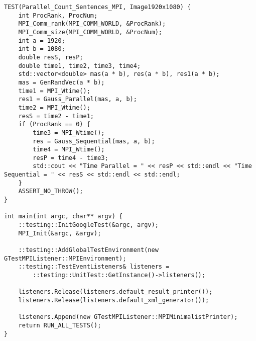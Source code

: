 \documentclass{report}
\begin{document}
\begin{lstlisting}
TEST(Parallel_Count_Sentences_MPI, Image1920x1080) {
    int ProcRank, ProcNum;
    MPI_Comm_rank(MPI_COMM_WORLD, &ProcRank);
    MPI_Comm_size(MPI_COMM_WORLD, &ProcNum);
    int a = 1920;
    int b = 1080;
    double resS, resP;
    double time1, time2, time3, time4;
    std::vector<double> mas(a * b), res(a * b), res1(a * b);
    mas = GenRandVec(a * b);
    time1 = MPI_Wtime();
    res1 = Gauss_Parallel(mas, a, b);
    time2 = MPI_Wtime();
    resS = time2 - time1;
    if (ProcRank == 0) {
        time3 = MPI_Wtime();
        res = Gauss_Sequential(mas, a, b);
        time4 = MPI_Wtime();
        resP = time4 - time3;
        std::cout << "Time Parallel = " << resP << std::endl << "Time Sequential = " << resS << std::endl << std::endl;
    }
    ASSERT_NO_THROW();
}

int main(int argc, char** argv) {
    ::testing::InitGoogleTest(&argc, argv);
    MPI_Init(&argc, &argv);

    ::testing::AddGlobalTestEnvironment(new GTestMPIListener::MPIEnvironment);
    ::testing::TestEventListeners& listeners =
        ::testing::UnitTest::GetInstance()->listeners();

    listeners.Release(listeners.default_result_printer());
    listeners.Release(listeners.default_xml_generator());

    listeners.Append(new GTestMPIListener::MPIMinimalistPrinter);
    return RUN_ALL_TESTS();
}
\end{lstlisting}
\end{document}
